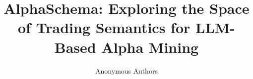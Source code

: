 \documentclass[letterpaper]{article}
\title{AlphaSchema: Exploring the Space of Trading Semantics for LLM-Based Alpha Mining}
\author{
Anonymous Authors
}
\begin{document}
\maketitle

\begin{abstract}

\end{abstract}












\appendix

\end{document}
